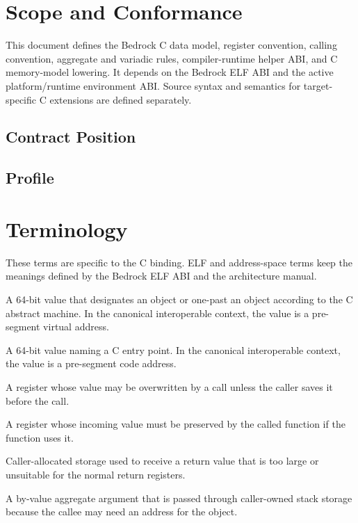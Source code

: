 \documentclass[10pt,twoside]{article}
\begin{document}
\BedrockFrontMatter

\clearpage
\section{Scope and Conformance}\label{page:scope-and-conformance}
This document defines the Bedrock C data model, register convention, calling
convention, aggregate and variadic rules, compiler-runtime helper ABI, and C
memory-model lowering. It depends on the
Bedrock ELF ABI and the active platform/runtime environment ABI. Source syntax
and semantics for target-specific C extensions are defined separately.

\subsection{Contract Position}

\subsection{Profile}

\clearpage
\section{Terminology}\label{page:terminology}
These terms are specific to the C binding. ELF and address-space terms keep the meanings defined by the Bedrock ELF ABI and the architecture manual.
\begin{description}[style=nextline,leftmargin=1.45in,labelwidth=1.35in,itemsep=3pt,topsep=3pt]
\item[object pointer] A 64-bit value that designates an object or one-past an object according to the C abstract machine. In the canonical interoperable context, the value is a pre-segment virtual address.
\item[function pointer] A 64-bit value naming a C entry point. In the canonical interoperable context, the value is a pre-segment code address.
\item[caller-saved register] A register whose value may be overwritten by a call unless the caller saves it before the call.
\item[callee-saved register] A register whose incoming value must be preserved by the called function if the function uses it.
\item[sret buffer] Caller-allocated storage used to receive a return value that is too large or unsuitable for the normal return registers.
\item[addressable by-value argument] A by-value aggregate argument that is passed through caller-owned stack storage because the callee may need an address for the object.
\end{description}
\end{document}
